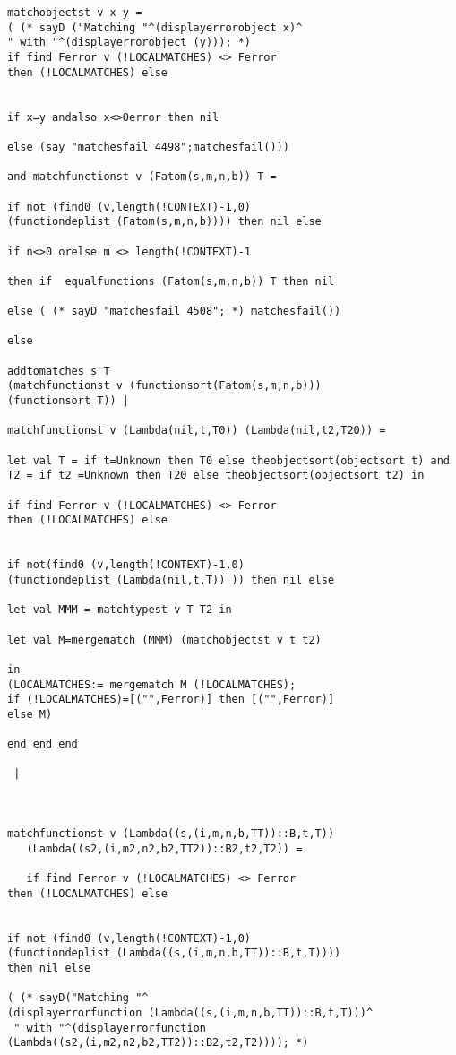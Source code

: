 \documentclass[12pt]{article}
\begin{document}
\begin{verbatim}
matchobjectst v x y = 
( (* sayD ("Matching "^(displayerrorobject x)^
" with "^(displayerrorobject (y))); *)
if find Ferror v (!LOCALMATCHES) <> Ferror 
then (!LOCALMATCHES) else


if x=y andalso x<>Oerror then nil 

else (say "matchesfail 4498";matchesfail()))

and matchfunctionst v (Fatom(s,m,n,b)) T =

if not (find0 (v,length(!CONTEXT)-1,0) 
(functiondeplist (Fatom(s,m,n,b)))) then nil else

if n<>0 orelse m <> length(!CONTEXT)-1

then if  equalfunctions (Fatom(s,m,n,b)) T then nil

else ( (* sayD "matchesfail 4508"; *) matchesfail())

else 

addtomatches s T 
(matchfunctionst v (functionsort(Fatom(s,m,n,b))) 
(functionsort T)) |

matchfunctionst v (Lambda(nil,t,T0)) (Lambda(nil,t2,T20)) =

let val T = if t=Unknown then T0 else theobjectsort(objectsort t) and
T2 = if t2 =Unknown then T20 else theobjectsort(objectsort t2) in

if find Ferror v (!LOCALMATCHES) <> Ferror 
then (!LOCALMATCHES) else


if not(find0 (v,length(!CONTEXT)-1,0) 
(functiondeplist (Lambda(nil,t,T)) )) then nil else

let val MMM = matchtypest v T T2 in

let val M=mergematch (MMM) (matchobjectst v t t2)

in
(LOCALMATCHES:= mergematch M (!LOCALMATCHES);
if (!LOCALMATCHES)=[("",Ferror)] then [("",Ferror)]
else M)

end end end

 |
 
 

matchfunctionst v (Lambda((s,(i,m,n,b,TT))::B,t,T))
   (Lambda((s2,(i,m2,n2,b2,TT2))::B2,t2,T2)) =
   
   if find Ferror v (!LOCALMATCHES) <> Ferror 
then (!LOCALMATCHES) else

   
if not (find0 (v,length(!CONTEXT)-1,0) 
(functiondeplist (Lambda((s,(i,m,n,b,TT))::B,t,T)))) 
then nil else

( (* sayD("Matching "^
(displayerrorfunction (Lambda((s,(i,m,n,b,TT))::B,t,T)))^
 " with "^(displayerrorfunction 
(Lambda((s2,(i,m2,n2,b2,TT2))::B2,t2,T2)))); *)


\end{verbatim}
\end{document}
